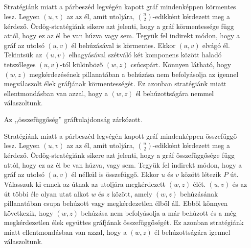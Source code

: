 \begin{Answer}
 Stratégiánk miatt a párbeszéd legvégén kapott gráf mindenképpen körmentes lesz. Legyen $(u,v)$ az az él, amit utoljára, $\binom{n}{2}$-edikként  kérdezett meg a kérdező. Ördög-stratégiánk sikere azt jelenti, hogy a gráf körmentessége függ attól, hogy ez az él be van húzva vagy sem. Tegyük fel indirekt módon, hogy a gráf az utolsó $(u,v)$ él behúzásával is körmentes. Ekkor $(u,v)$ elvágó él. Tekintsük az $(u,v)$ elhagyásával szétváló két komponens között haladó tetszőleges $(u,v)$-tól különböző $(w,z)$ csúcspárt.  Könnyen látható, hogy $(w,z)$ megkérdezésének pillanatában a behúzása nem befolyásolja az igennel megválaszolt élek gráfjának körmentességét. Ez azonban stratégiánk miatt ellentmondásban van azzal, hogy a $(w,z)$ él behúzottságára nemmel válaszoltunk.
\end{Answer}

\begin{Exercise}[counter={sorszam}, difficulty=0]
Az ,,összefüggőség'' gráftulajdonság zárkózott.


\end{Exercise}

\begin{Answer}
 Stratégiánk miatt a párbeszéd legvégén kapott gráf mindenképpen összefüggő lesz. Legyen $(u,v)$ az az él, amit utoljára, $\binom{n}{2}$-edikként  kérdezett meg a kérdező. Ördög-stratégiánk sikere azt jelenti, hogy a gráf összefüggősége függ attól, hogy ez az él be van húzva, vagy sem. Tegyük fel indirekt módon, hogy a gráf az utolsó $(u,v)$ él nélkül is összefüggő. Ekkor $u$ és $v$ között létezik $P$ út. Válasszuk ki ennek az útnak az utoljára megkérdezett $(w,z)$ élét. $(u,v)$ és az út többi éle olyan utat alkot $w$ és $z$ között, amely $(w,z)$ behúzásának pillanatában csupa behúzott vagy megkérdezetlen élből áll. Ebből könnyen következik, hogy $(w,z)$ behúzása nem befolyásolja a már behúzott és a még megkérdezetlen élek együttes gráfjának összefüggőségét. Ez azonban stratégiánk miatt ellentmondásban van azzal, hogy a $(w,z)$ él behúzottságára igennel válaszoltunk.
\end{Answer}


